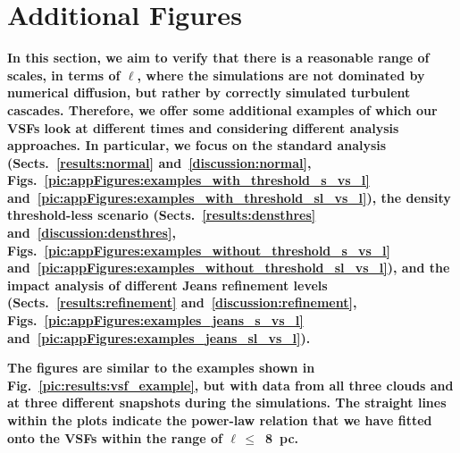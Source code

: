 \newpage

\section{Additional Figures}\label{appFigures}

\textbf{
    In this section, we aim to verify that there is a reasonable range of scales, in terms of $\ell$, where the simulations are not dominated by numerical diffusion, but rather by correctly simulated turbulent cascades.
    Therefore, we offer some additional examples of which our VSFs look at different times and considering different analysis approaches.
    In particular, we focus on the standard analysis (Sects.~\ref{results:normal} and~\ref{discussion:normal}, Figs.~\ref{pic:appFigures:examples_with_threshold_s_vs_l} and~\ref{pic:appFigures:examples_with_threshold_sl_vs_l}), the density threshold-less scenario (Sects.~\ref{results:densthres} and~\ref{discussion:densthres}, Figs.~\ref{pic:appFigures:examples_without_threshold_s_vs_l} and~\ref{pic:appFigures:examples_without_threshold_sl_vs_l}), and the impact analysis of different Jeans refinement levels (Sects.~\ref{results:refinement} and~\ref{discussion:refinement}, Figs.~\ref{pic:appFigures:examples_jeans_s_vs_l} and~\ref{pic:appFigures:examples_jeans_sl_vs_l}).
}

\textbf{
    The figures are similar to the examples shown in Fig.~\ref{pic:results:vsf_example}, but with data from all three clouds and at three different snapshots during the simulations.
    The straight lines within the plots indicate the power-law relation that we have fitted onto the VSFs within the range of $\ell\,\leq$~8~pc.
}

 	

